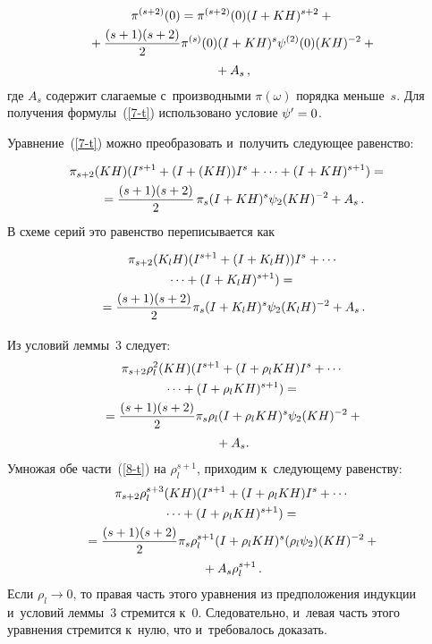 \begin{multicols}{2}
 \noindent
\begin{multline}
\pi^{(s+2)}(0)=\pi^{(s+2)}(0)(I+KH)^{s+2}+{}\\
{}+
\displaystyle\frac{\displaystyle (s+1)(s+2)\mathstrut}{\displaystyle 2\mathstrut}\pi^{(s)}(0)(I+KH)^{s}\psi^{(2)}(0) (KH)^{-2}+{}\\
{}+A_s\,,
\label{7-t}
\end{multline}
где $A_s$ содержит слагаемые с~производными $\pi(\omega)$ порядка меньше~$s$.
Для получения формулы~(\ref{7-t}) использовано условие $\psi'\hm=0$.

Уравнение~(\ref{7-t}) можно преобразовать и~получить следующее равенство:

\noindent
\begin{multline*}
\hspace*{-3mm}\pi_{s+2}(KH)(I^{s+1}+(I+(KH))I^s+\cdots +(I+KH)^{s+1})={}\hspace*{-1.96pt}\\
{}=\fr{(s+1)(s+2)}{2}\,\pi_{s} (I+KH)^{s} \psi_{2} (KH)^{-2}+A_s\,.
\end{multline*}
В схеме серий это равенство переписывается как

\noindent
\begin{multline*}
 \pi_{s+2}(K_lH)(I^{s+1}+(I+K_lH))I^s+\cdots\\
 {}\cdots +(I+K_lH)^{s+1})={}
\\
 {}=\displaystyle\frac{\displaystyle (s+1)(s+2)\mathstrut}{\displaystyle 2\mathstrut}\pi_{s} (I+K_lH)^{s} \psi_{2} (K_lH)^{-2}+A_s \,.
\end{multline*}

Из условий леммы~3 следует:
\begin{multline}
\pi_{s+2}\rho_l^2(KH)(I^{s+1}+(I+\rho_lKH)I^s+\cdots{}\\
{}\cdots
+(I+\rho_lKH)^{s+1})={}\\
{}=\displaystyle\frac{\displaystyle (s+1)(s+2)\mathstrut}{\displaystyle 2\mathstrut}\pi_{s} \rho_l (I+\rho_l KH)^{s} \psi_{2} (KH)^{-2}+{}\\
{}+A_s.
\label{8-t}
\end{multline}
Умножая обе части~(\ref{8-t}) на $\rho_l^{s+1}$, приходим  к~сле\-ду\-юще\-му равенству:
\begin{multline*}
\pi_{s+2}\rho_l^{s+3}(KH)(I^{s+1}+(I+\rho_lKH)I^s+\cdots{}\\
{}\cdots
+(I+\rho_lKH)^{s+1})={}\\
{}=\displaystyle\frac{\displaystyle (s+1)(s+2)\mathstrut}{\displaystyle 2\mathstrut}\pi_{s}\rho_l^{s+1} (I+\rho_l KH)^{s}(\rho_l \psi_{2})
(KH)^{-2}+{}\\
{}+A_s \rho_l^{s+1}\,.
\end{multline*}
Если $\rho_l \rightarrow 0$, то правая часть этого уравнения из предположения
индукции и~условий леммы~3 стремится к~$0$. Следовательно, и~левая часть этого
уравнения стремится к~нулю, что и~требовалось доказать.


\end{multicols}
